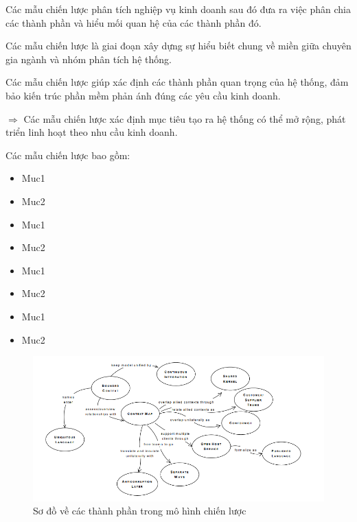 
Các mẫu chiến lược phân tích nghiệp vụ kinh doanh sau đó đưa ra việc phân chia các thành phần và hiểu mối quan hệ của các thành phần đó.

Các mẫu chiến lược là giai đoạn xây dựng sự hiểu biết chung về miền giữa chuyên gia ngành và nhóm phân tích hệ thống.

Các mẫu chiến lược giúp xác định các thành phần quan trọng của hệ thống, đảm bảo kiến trúc phần mềm phản ánh đúng các yêu cầu kinh doanh.

$\Rightarrow$ Các mẫu chiến lược xác định mục tiêu tạo ra hệ thống có thể mở rộng, phát triển linh hoạt theo nhu cầu kinh doanh.

Các mẫu chiến lược bao gồm:

\begin{itemize}

    \item Muc1 

    \item Muc2 

    \item Muc1 

    \item Muc2 

    \item Muc1 

    \item Muc2 

    \item Muc1 

    \item Muc2 

\end{itemize}



\begin{figure}[H]

    \centering

    \includegraphics[scale = 0.9]{pictures/cac_mau_chien_luoc/temp.png}

    \caption{Sơ đồ về các thành phần trong mô hình chiến lược}

\end{figure}

